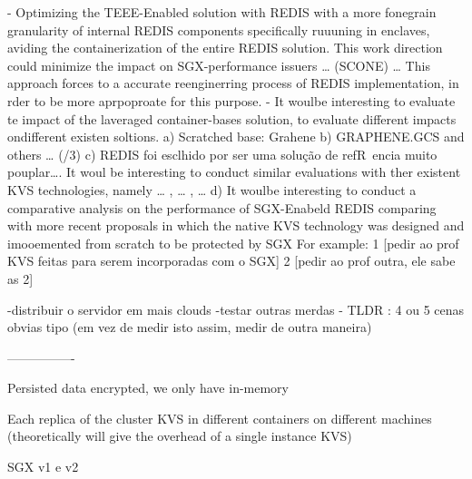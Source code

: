 -  Optimizing the TEEE-Enabled solution with REDIS with a more fonegrain granularity of internal REDIS components specifically ruuuning in enclaves, aviding the containerization of the entire REDIS solution. This work direction could minimize the impact on SGX-performance issuers … (SCONE) …  
This approach forces to a accurate reenginerring process of REDIS implementation, in rder to be more aprpoproate for this purpose.
- It woulbe interesting to evaluate te impact of the laveraged container-bases solution, to evaluate different impacts ondifferent existen soltions. 
a) Scratched base:  Grahene 
b) GRAPHENE.GCS and others … (/3)
c) REDIS foi esclhido por ser uma solução de refR~encia muito pouplar….    It woul be interesting to conduct similar evaluations with ther
existent KVS technologies, namely … , … , … 
d) It woulbe interesting to conduct a comparative analysis on the performance of SGX-Enabeld REDIS comparing with more recent
proposals in which the native KVS technology was designed and imooemented from scratch to be protected by SGX
For example:    1 [pedir ao prof KVS feitas para serem incorporadas com o SGX]    2 [pedir ao prof outra, ele sabe as 2] 



-distribuir o servidor em mais clouds
-testar outras merdas
- TLDR : 4 ou 5 cenas obvias tipo (em vez de medir isto assim, medir de outra maneira)

----------------

Persisted data encrypted, we only have in-memory

Each replica of the cluster KVS in different containers on different machines (theoretically will give the overhead of a single instance KVS)

SGX v1 e v2
